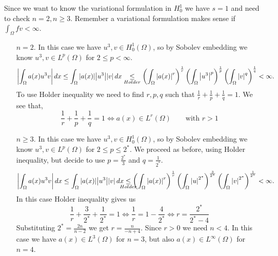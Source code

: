     Since we want to know the variational formulation in \(H^1_0\) we have \(s = 1\) and need to check \(n = 2, n \geq 3\). Remember a variational formulation makes sense if \(\int_\Omega fv < \infty\).
    \begin{itemize}
        \item[\(n = 2\).] In this case we have \(u^3, v \in H^1_0(\Omega)\), so by Sobolev embedding we know \(u^3, v \in L^p(\Omega)\) for \(2 \leq p < \infty\). 
        \[
            \abs{\int_\Omega a(x) u^3 v}  \, dx \leq \int_\Omega \abs{a(x)} \abs{u^3} \abs{v} \, dx \underset{Holder}{\leq} \left(\int_\Omega \abs{a(x)}^r\right)^{\frac{1}{r}} \left(\int_\Omega \abs{u^3}^p \right)^{\frac{1}{p}} \left(\int_\Omega \abs{v}^q \right)^{\frac{1}{q}} < \infty.
        \]
        To use Holder inequality we need to find \(r, p, q\) such that \(\frac{1}{r} + \frac{1}{p} + \frac{1}{q} = 1\). We see that, 
        \[
            \frac{1}{r} + \frac{1}{p} + \frac{1}{q} = 1 \iff a(x) \in L^r(\Omega) \qquad \text{with } r > 1
        \]
        \item[\(n \geq 3\).] In this case we have \(u^3, v \in H^1_0(\Omega)\), so by Sobolev embedding we know \(u^3, v \in L^p(\Omega)\) for \(2 \leq p \leq 2^*\).
        We proceed as before, using Holder inequality, but decide to use \(p = \frac{2^*}{3}\) and \(q = \frac{1}{2^*}.\)
        \[
            \abs{\int_\Omega a(x) u^3 v}  \, dx \leq \int_\Omega \abs{a(x)} \abs{u^3} \abs{v} \, dx \underset{\mathclap{Holder}}{\leq} \left(\int_\Omega \abs{a(x)}^r\right)^{\frac{1}{r}} \left(\int_\Omega \abs{u}^{2^*} \right)^{\frac{3}{2^*}} \left(\int_\Omega \abs{v}^{2^*} \right)^{\frac{1}{2^*}} < \infty.
        \]
        In this case Holder inequality gives us 
        \[
            \frac{1}{r} + \frac{3}{2^*} + \frac{1}{2^*} = 1 \iff \frac{1}{r} = 1 - \frac{4}{2^*} \iff r = \frac{2^*}{2^* - 4}
        \]
        Substituting \(2^* = \frac{2n}{n - 2}\) we get \(r = \frac{n}{-n + 4}\). Since \(r > 0\) we need \(n < 4\).
        In this case we have \(a(x) \in L^3(\Omega)\) for \(n = 3\), but also \(a(x) \in L^\infty(\Omega)\) for \(n = 4\).
    \end{itemize}
    
